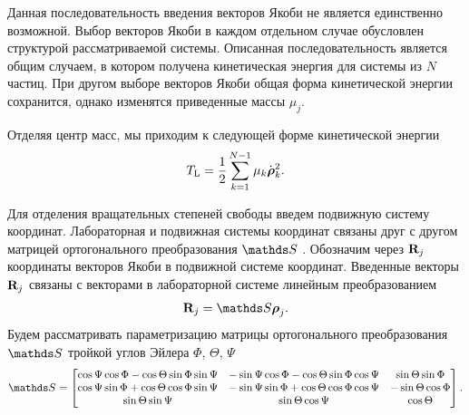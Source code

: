 Данная последовательность введения векторов Якоби не является единственно возможной. Выбор векторов Якоби в каждом отдельном случае обусловлен структурой рассматриваемой системы. Описанная последовательность является общим случаем, в котором получена кинетическая энергия для системы из $N$ частиц. При другом выборе векторов Якоби общая форма кинетической энергии сохранится, однако изменятся приведенные массы $\mu_j$. \par
Отделяя центр масс, мы приходим к следующей форме кинетической энергии
\begin{gather}
    T_\text{L} = \frac{1}{2} \sum_{k = 1}^{N - 1} \mu_k \dot{\boldsymbol{\rho}}_k^2.
\end{gather}

Для отделения вращательных степеней свободы введем подвижную систему координат. Лабораторная и подвижная системы координат связаны друг с другом матрицей ортогонального преобразования $\bbS$ \cite{goldstein}. Обозначим через $\mathbf{R}_j$ координаты векторов Якоби в подвижной системе координат. Введенные векторы $\mathbf{R}_j$ связаны с векторами в лабораторной системе линейным преобразованием
\begin{gather}
    \mf{R}_j = \bbS \boldsymbol{\rho}_j.
\end{gather}
Будем рассматривать параметризацию матрицы ортогонального преобразования $\bbS$ тройкой углов Эйлера $\Phi$, $\Theta$, $\Psi$ \cite{goldstein}
\begin{gather}
    \bbS = 
    \begin{bmatrix}
        \cos \Psi \cos \Phi - \cos \Theta \sin \Phi \sin \Psi & -\sin \Psi \cos \Phi - \cos \Theta \sin \Phi \cos \Psi & \sin \Theta \sin \Phi \\ 
        \cos \Psi \sin \Phi + \cos \Theta \cos \Phi \sin \Psi & -\sin \Psi \sin \Phi + \cos \Theta \cos \Phi \cos \Psi & - \sin \Theta \cos \Phi \\
        \sin \Theta \sin \Psi & \sin \Theta \cos \Psi & \cos \Theta
    \end{bmatrix}.
\end{gather}

